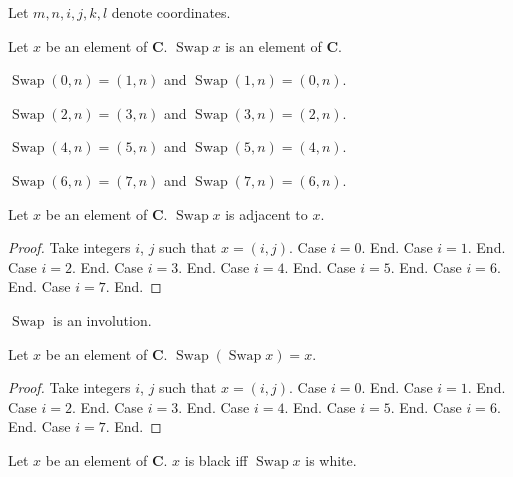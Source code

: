 \documentclass{article}
\newcommand{\Checkerboard}{\mathbf{C}}
\newcommand{\Swap}[1]{\operatorname{Swap}#1}
\begin{document}
\begin{forthel}
    Let $m, n, i, j, k, l$ denote coordinates.

    \begin{signature}
        Let $x$ be an element of $\Checkerboard$.
        $\Swap{x}$ is an element of $\Checkerboard$.
    \end{signature}

    \begin{axiom} $\Swap{(0, n)} = (1, n)$ and $\Swap{(1, n)} = (0, n)$. \end{axiom}

    \begin{axiom} $\Swap{(2, n)} = (3, n)$ and $\Swap{(3, n)} = (2, n)$. \end{axiom}

    \begin{axiom} $\Swap{(4, n)} = (5, n)$ and $\Swap{(5, n)} = (4, n)$. \end{axiom}

    \begin{axiom} $\Swap{(6, n)} = (7, n)$ and $\Swap{(7, n)} = (6, n)$. \end{axiom}

    \begin{lemma}
        Let $x$ be an element of $\Checkerboard$.
        $\Swap{x}$ is adjacent to $x$.
    \end{lemma}
    \begin{proof}
        Take integers $i$, $j$ such that $x = (i, j)$.
        Case $i = 0$. End.
        Case $i = 1$. End.
        Case $i = 2$. End.
        Case $i = 3$. End.
        Case $i = 4$. End.
        Case $i = 5$. End.
        Case $i = 6$. End.
        Case $i = 7$. End.
    \end{proof}
\end{forthel}

$\Swap{}$ is an involution.

\begin{forthel}
    \begin{lemma}
        Let $x$ be an element of $\Checkerboard$.
        $\Swap{(\Swap{x})} = x$.
    \end{lemma}
    \begin{proof}
        Take integers $i$, $j$ such that $x = (i, j)$.
        Case $i = 0$. End.
        Case $i = 1$. End.
        Case $i = 2$. End.
        Case $i = 3$. End.
        Case $i = 4$. End.
        Case $i = 5$. End.
        Case $i = 6$. End.
        Case $i = 7$. End.
    \end{proof}

    \begin{lemma}
        Let $x$ be an element of $\Checkerboard$.
        $x$ is black iff $\Swap{x}$ is white.
    \end{lemma}
\end{forthel}
\end{document}

